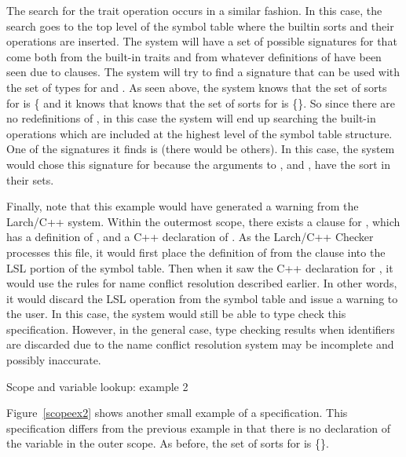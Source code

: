 The search for the trait operation \reserved{+} occurs in a similar
fashion. In this case, the search goes to the top level of the symbol
table where the builtin sorts and their operations are inserted. The
system will have a set of possible signatures for \reserved{+} that come
both from the built-in traits and from whatever definitions of
\reserved{+} have been seen due to  clauses. The system 
will try to find a signature that can be used with the set of types
for  and . As seen above, the system knows
that the set of sorts for  is \{ and it
knows that knows that the set of sorts for  is
\{\}. So since there are no redefinitions
of \reserved{+}, in this case the system will end up searching the
built-in operations which are included at the highest level of the
symbol table structure. One of the signatures it finds is
 (there would be others). In this case, the 
system would chose this signature for \reserved{+} because the
arguments to \reserved{+},  and , have the
sort  in their sets. 

Finally, note that this example would have generated a warning from
the Larch/C++ system. Within the outermost scope, there exists a
 clause for , which has a definition of
, and a C++ declaration of . As the Larch/C++
Checker processes this file, it would first place the definition of
 from the  clause into the LSL portion of
the symbol table. Then when it saw the C++ declaration for
, it would use the rules for name conflict resolution
described earlier. In other words, it would discard the LSL operation
from the symbol table and issue a warning to the user. In this case,
the system would still be able to type check this
specification. However, in the general case, type checking results
when identifiers are discarded due to the name conflict resolution
system may be incomplete and possibly inaccurate.

\begin{BFIGURE}
\begin{center}

\end{center}
\caption{Scope and variable lookup: example 2}
\label{scopeex2}
\end{BFIGURE}

Figure~\ref{scopeex2} shows another small example of a
specification. This specification differs from the previous example in
that there is no declaration of the variable  in the outer
scope. As before, the set of sorts for  is \{\}.


